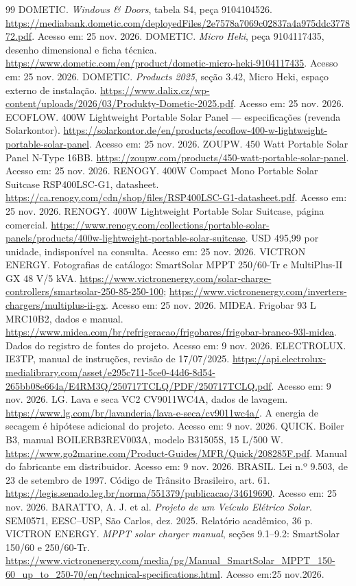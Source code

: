 \documentclass[12pt,a4paper]{article}
\begin{document}
\begin{thebibliography}{99}
 DOMETIC. \emph{Windows \& Doors}, tabela S4, peça 9104104526. \url{https://mediabank.dometic.com/deployedFiles/2e7578a7069c02837a4a975ddc377872.pdf}. Acesso em: 25 nov. 2026.
 DOMETIC. \emph{Micro Heki}, peça 9104117435, desenho dimensional e ficha técnica. \url{https://www.dometic.com/en/product/dometic-micro-heki-9104117435}. Acesso em: 25 nov. 2026.
 DOMETIC. \emph{Products 2025}, seção 3.42, Micro Heki, espaço externo de instalação. \url{https://www.dalix.cz/wp-content/uploads/2026/03/Produkty-Dometic-2025.pdf}. Acesso em: 25 nov. 2026.
 ECOFLOW. 400W Lightweight Portable Solar Panel — especificações (revenda Solarkontor). \url{https://solarkontor.de/en/products/ecoflow-400-w-lightweight-portable-solar-panel}. Acesso em: 25 nov. 2026.
 ZOUPW. 450 Watt Portable Solar Panel N-Type 16BB. \url{https://zoupw.com/products/450-watt-portable-solar-panel}. Acesso em: 25 nov. 2026.
 RENOGY. 400W Compact Mono Portable Solar Suitcase RSP400LSC-G1, datasheet. \url{https://ca.renogy.com/cdn/shop/files/RSP400LSC-G1-datasheet.pdf}. Acesso em: 25 nov. 2026.
 RENOGY. 400W Lightweight Portable Solar Suitcase, página comercial. \url{https://www.renogy.com/collections/portable-solar-panels/products/400w-lightweight-portable-solar-suitcase}. USD 495,99 por unidade, indisponível na consulta. Acesso em: 25 nov. 2026.
 VICTRON ENERGY. Fotografias de catálogo: SmartSolar MPPT 250/60-Tr e MultiPlus-II GX 48 V/5 kVA. \url{https://www.victronenergy.com/solar-charge-controllers/smartsolar-250-85-250-100}; \url{https://www.victronenergy.com/inverters-chargers/multiplus-ii-gx}. Acesso em: 25 nov. 2026.
 MIDEA. Frigobar 93 L MRC10B2, dados e manual. \url{https://www.midea.com/br/refrigeracao/frigobares/frigobar-branco-93l-midea}. Dados do registro de fontes do projeto. Acesso em: 9 nov. 2026.
 ELECTROLUX. IE3TP, manual de instruções, revisão de 17/07/2025. \url{https://api.electrolux-medialibrary.com/asset/e295c711-5ce0-44d6-8d54-265bb08e664a/E4RM3Q/250717TCLQ/PDF/250717TCLQ.pdf}. Acesso em: 9 nov. 2026.
 LG. Lava e seca VC2 CV9011WC4A, dados de lavagem. \url{https://www.lg.com/br/lavanderia/lava-e-seca/cv9011wc4a/}. A energia de secagem é hipótese adicional do projeto. Acesso em: 9 nov. 2026.
 QUICK. Boiler B3, manual BOILERB3REV003A, modelo B31505S, 15 L/500 W. \url{https://www.go2marine.com/Product-Guides/MFR/Quick/208285F.pdf}. Manual do fabricante em distribuidor. Acesso em: 9 nov. 2026.
 BRASIL. Lei n.º 9.503, de 23 de setembro de 1997. Código de Trânsito Brasileiro, art. 61. \url{https://legis.senado.leg.br/norma/551379/publicacao/34619690}. Acesso em: 25 nov. 2026.
 BARATTO, A. J. et al. \emph{Projeto de um Veículo Elétrico Solar}.
SEM0571, EESC--USP, São Carlos, dez. 2025. Relatório acadêmico, 36 p.
 VICTRON ENERGY. \emph{MPPT solar charger manual}, seções 9.1--9.2: SmartSolar 150/60 e 250/60-Tr. \url{https://www.victronenergy.com/media/pg/Manual_SmartSolar_MPPT_150-60_up_to_250-70/en/technical-specifications.html}. Acesso em:25 nov.2026.
\end{thebibliography}
\end{document}
